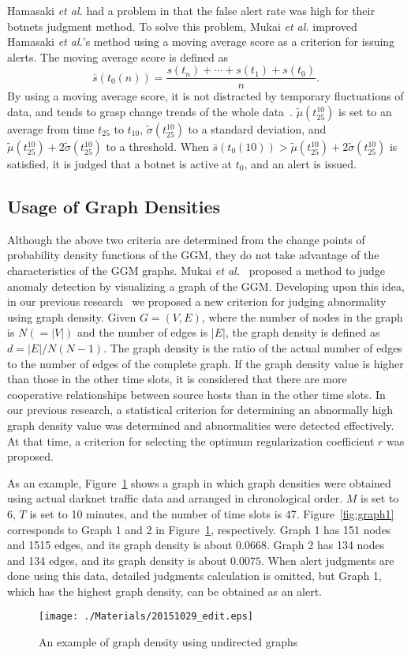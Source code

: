 \documentclass[letterpaper]{sig-alternate-10pt}
\begin{document}
Hamasaki {\it et al.} had a problem in that the false alert rate was high for their botnets judgment method.
To solve this problem, Mukai {\it et al.} improved Hamasaki {\it et al.}'s method using a moving average score as a criterion for issuing alerts.
The moving average score is defined as
\begin{equation*}
\bar{s}(t_{0}(n))=\frac{s(t_{n})+\cdots+s(t_{1})+s(t_{0})}{n}.
\end{equation*}
By using a moving average score, it is not distracted by temporary fluctuations of data, and tends to grasp change trends of the whole data~\cite{Falt}.
$\tilde{\mu}(t_{25}^{10})$ is set to an average from time $t_{25}$ to $t_{10}$, $\tilde{\sigma}(t_{25}^{10})$ to a standard deviation, and $\tilde{\mu}(t_{25}^{10})+2\tilde{\sigma}(t_{25}^{10})$ to a threshold.
When $\bar{s}(t_{0}(10))>\tilde{\mu}(t_{25}^{10})+2\tilde{\sigma}(t_{25}^{10})$ is satisfied, it is judged that a botnet is active at $t_{0}$, and an alert is issued.


\subsection{Usage of Graph Densities}
Although the above two criteria are determined from the change points of probability density functions of the GGM, they do not take advantage of the characteristics of the GGM graphs.
Mukai {\it et al.}~\cite{Mukai2} proposed a method to judge anomaly detection by visualizing a graph of the GGM.
Developing upon this idea, in our previous research~\cite{Han} we proposed a new criterion for judging abnormality using graph density.
Given $G=(V,E)$, where the number of nodes in the graph is $N(=|V|)$ and the number of edges is $|E|$, the graph density is defined as $d=|E|/N(N-1)$.
The graph density is the ratio of the actual number of edges to the number of edges of the complete graph.
If the graph density value is higher than those in the other time slots, it is considered that there are more cooperative relationships between source hosts than in the other time slots.
In our previous research, a statistical criterion for determining an abnormally high graph density value was determined and abnormalities were detected effectively.
At that time, a criterion for selecting the optimum regularization coefficient $r$ was proposed.

As an example, Figure~\ref{fig:density} shows a graph in which graph densities were obtained using actual darknet traffic data and arranged in chronological order.
$M$ is set to $6$, $T$ is set to 10 minutes, and the number of time slots is 47.
Figure~\ref{fig:graph1} corresponds to Graph 1 and 2 in Figure~\ref{fig:density}, respectively.
Graph 1 has 151 nodes and 1515 edges, and its graph density is about $0.0668$.
Graph 2 has 134 nodes and 134 edges, and its graph density is about $0.0075$.
When alert judgments are done using this data, detailed judgments calculation is omitted, but Graph 1, which has the highest graph density, can be obtained as an alert.
\begin{figure}[htbp]
	\texttt{[image: ./Materials/20151029\_edit.eps]}
	\caption{An example of graph density using undirected graphs}
  	\label{fig:density}
\end{figure}
\end{document}

